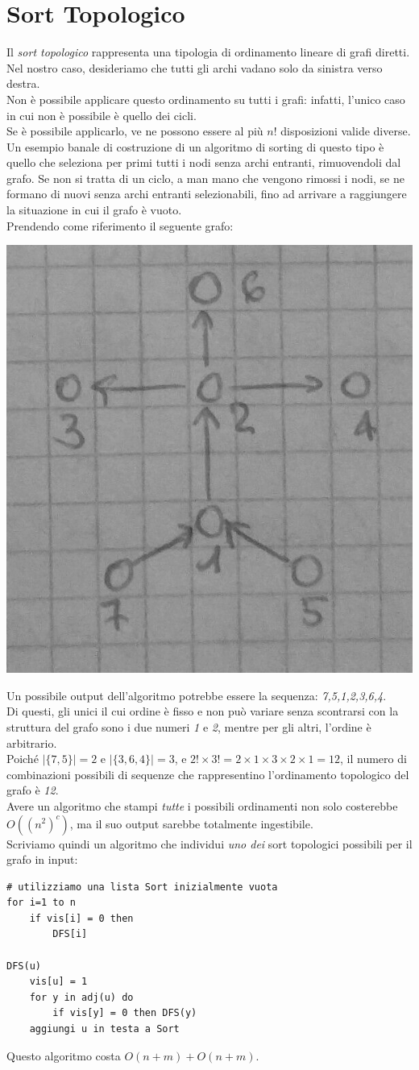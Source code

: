 \section{Sort Topologico}
Il \textit{sort topologico} rappresenta una tipologia di ordinamento lineare di grafi diretti. Nel nostro caso, desideriamo che tutti gli archi vadano solo da sinistra verso destra. \\
Non è possibile applicare questo ordinamento su tutti i grafi: infatti, l'unico caso in cui non è possibile è quello dei cicli. \\
Se è possibile applicarlo, ve ne possono essere al più $n!$ disposizioni valide diverse. \\
Un esempio banale di costruzione di un algoritmo di sorting di questo tipo è quello che seleziona per primi tutti i nodi senza archi entranti, rimuovendoli dal grafo. Se non si tratta di un ciclo, a man mano che vengono rimossi i nodi, se ne formano di nuovi senza archi entranti selezionabili, fino ad arrivare a raggiungere la situazione in cui il grafo è vuoto. \\
Prendendo come riferimento il seguente grafo:
\begin{center}
    \includegraphics[width=.2\textwidth]{res/sort-topologico.jpg} \hfill
\end{center}
Un possibile output dell'algoritmo potrebbe essere la sequenza: \textit{7,5,1,2,3,6,4}.\\
Di questi, gli unici il cui ordine è fisso e non può variare senza scontrarsi con la struttura del grafo sono i due numeri \textit{1} e \textit{2}, mentre per gli altri, l'ordine è arbitrario. \\
Poiché $|\{7,5\}|=2$ e $|\{3,6,4\}|=3$, e $2!\times 3! = 2\times 1\times 3\times 2\times 1 = 12$, il numero di combinazioni possibili di sequenze che rappresentino l'ordinamento topologico del grafo è \textit{12}. \\
Avere un algoritmo che stampi \textit{tutte} i possibili ordinamenti non solo costerebbe $O((n^2)^c)$, ma il suo output sarebbe totalmente ingestibile. \\
Scriviamo quindi un algoritmo che individui \textit{uno dei} sort topologici possibili per il grafo in input:
\begin{lstlisting}
# utilizziamo una lista Sort inizialmente vuota
for i=1 to n
    if vis[i] = 0 then
        DFS[i]

DFS(u)
    vis[u] = 1
    for y in adj(u) do
        if vis[y] = 0 then DFS(y)
    aggiungi u in testa a Sort
\end{lstlisting}
Questo algoritmo costa $O(n+m)+O(n+m)$.

